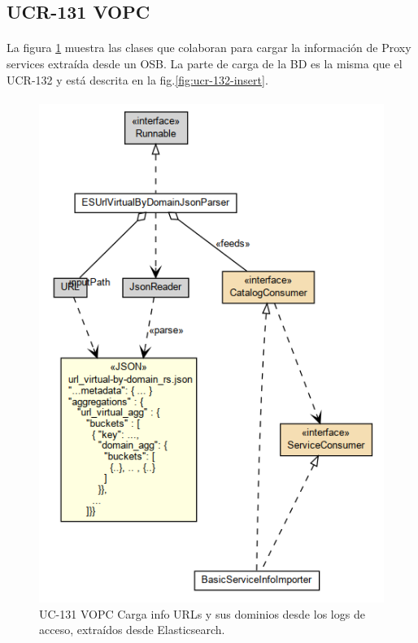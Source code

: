 \subsection{UCR-131 VOPC}
\paragraph{}
La figura \ref{fig:ucr-131-insert} muestra las clases que colaboran para cargar
la informaci\'on de Proxy services extra\'ida desde un OSB.
%
La parte de carga de la BD es la misma que el UCR-132 y est\'a descrita en 
la fig.\ref{fig:ucr-132-insert}.

\paragraph{}


\begin{figure}[hbtp]
    \centering
    \includegraphics[width=.5\textwidth]{ucr-131-vopc-insert-access_logs-info.png}
    \caption{UC-131 VOPC Carga info URLs y sus dominios desde los logs de acceso, extra\'idos desde Elasticsearch.}
    \label{fig:ucr-131-insert}
\end{figure}
